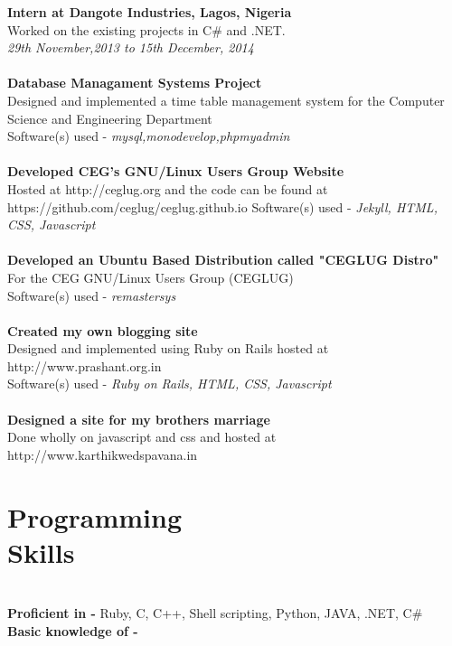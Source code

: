 \documentclass[margin,line]{resume}
\begin{document}
\begin{resume}
    \textbf{Intern at Dangote Industries, Lagos, Nigeria} \\Worked on the existing projects in C# and .NET. 
\\\textsl{29th November,2013 to 15th December, 2014 }
    \\\\\textbf{Database Managament Systems Project} \\Designed and implemented a time table management system for the Computer Science and Engineering Department \vspace{2mm}\\\vspace{1mm}%
    Software(s) used -  \textsl{mysql,monodevelop,phpmyadmin}\\
    \\\textbf{Developed CEG's GNU/Linux Users Group Website}\\Hosted at http://ceglug.org and the code can be found at https://github.com/ceglug/ceglug.github.io
    Software(s) used -  \textsl{Jekyll, HTML, CSS, Javascript}\\
    \\\textbf{Developed an Ubuntu Based Distribution called "CEGLUG Distro"} \\For the CEG GNU/Linux Users Group (CEGLUG) \vspace{2mm}\\\vspace{1mm}%
    Software(s) used -  \textsl{remastersys}\\
    \\\textbf{Created my own blogging site} \\Designed and implemented using Ruby on Rails hosted at http://www.prashant.org.in \vspace{2mm}\\\vspace{1mm}%
    Software(s) used -  \textsl{Ruby on Rails, HTML, CSS, Javascript}\\
    \\\textbf{Designed a site for my brothers marriage} \\Done wholly on javascript and css and hosted at http://www.karthikwedspavana.in  \vspace{2mm}\\\vspace{1mm}%

    \section{\mysidestyle Programming\\Skills}\\ 
    \textbf{Proficient in -}  Ruby, C, C++, Shell scripting, Python, JAVA, .NET, C#
\\\textbf{Basic knowledge of -}  \LaTeXe


\end{resume}
\end{document}
